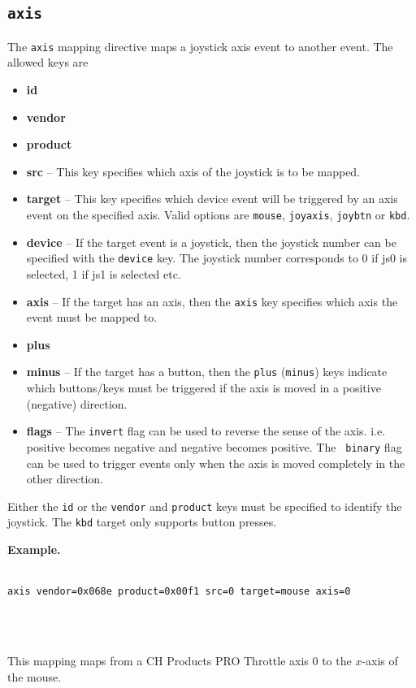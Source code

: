 \documentclass{article}
\begin{document}
\subsection{{\tt axis}}
The {\tt axis} mapping directive maps a joystick axis event 
to another event. The allowed keys are 
\begin{itemize}
	\item {\bf id}
	\item {\bf vendor}
	\item {\bf product}
	\item {\bf src} -- This key specifies which axis of the joystick is to be mapped.
	\item {\bf target} -- This key specifies which device event will be triggered
				by an axis event on the specified axis. Valid
				options are {\tt mouse}, {\tt joyaxis}, {\tt joybtn} or {\tt kbd}.
	\item {\bf device} -- If the target event is a joystick, then the joystick 
				number can be specified with the {\tt device} key.
				The joystick number corresponds to 0 if js0 is selected, 1 if js1 is selected etc.
	\item {\bf axis} -- If the target has an axis, then the {\tt axis} key specifies
				which axis the event must be mapped to.
	\item {\bf plus} 
	\item {\bf minus} -- If the target has a button, then the {\tt plus} ({\tt minus})
				keys indicate which buttons/keys must be triggered
				if the axis is moved in a positive (negative) direction.
	\item {\bf flags} -- The {\tt invert} flag can be used to reverse the sense of the
				axis. i.e. positive becomes negative and negative becomes positive. The {\tt
                binary} flag can be used to trigger events only when the axis is moved
                completely in the other direction.
\end{itemize}
Either the {\tt id} or the {\tt vendor} and {\tt product} keys must be specified to identify the
joystick. The {\tt kbd} target only supports button presses.

{\bf Example.}\\
\strut\\
{\tt axis vendor=0x068e product=0x00f1 src=0 target=mouse axis=0}
\strut\\
\strut\\
This mapping maps from a CH Products PRO Throttle axis 0 to the $x$-axis of the mouse.
\end{document}
